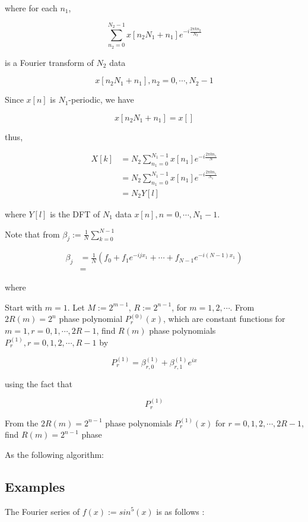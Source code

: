 \documentclass[12pt]{article}
\theoremstyle{nonumberbreak}
\begin{document}
where for each $n_1$,

$$
\sum_{n_2=0}^{N_2-1} x[n_2 N_1 + n_1] e^{-i \frac{2\pi kn_2}{N_2}}
$$

is a Fourier transform of $N_2$ data

$$
x[n_2 N_1 + n_1], n_2 = 0,\cdots, N_2 -1
$$

Since $x[n]$ is $N_1$-periodic, we have

$$
x[n_2 N_1 + n_1] = x[]
$$

thus,


$$
\begin{aligned}
X[k] &= N_2 \sum_{n_1=0}^{N_1 -1} x[n_1] e^{-i\frac{2\pi k n_1}{N}} \\[8pt]
&= N_2 \sum_{n_1=0}^{N_1-1} x[n_1] e^{-i \frac{2\pi k n_1}{N_1}} \\[8pt]
&= N_2 Y[l]
\end{aligned}
$$

where $Y[l]$ is the DFT of $N_1$ data $x[n], n=0,\cdots,N_1-1$. 



Note that from $\beta_j := \frac{1}{N} \sum_{k=0}^{N-1}$

$$
\begin{aligned}
\beta_j &= \frac{1}{N} \left( f_0 + f_1 e^{-ijx_1} + \cdots + f_{N-1} e^{-i(N-1)x_1} \right) \\[8pt]
&= 
\end{aligned}
$$

where


Start with $m=1$. Let $M:= 2^{m-1}$, $R:= 2^{n-1}$, for $m=1,2,\cdots$. From $2R(m) = 2^n$ phase polynomial $P_r^{(0)}(x)$, which are constant functions for $m=1, r=0,1,\cdots,2R-1$, find $R(m)$ phase polynomials $P_r^{(1)}, r=0,1,2,\cdots,R-1$ by

$$
P_r^{(1)} = \beta_{r,0}^{(1)} + \beta_{r,1}^{(1)} e^{ix}
$$

using the fact that 

$$
P_r^{(1)}
$$


From the $2R(m) = 2^{n-1}$ phase polynomials $P_r^{(1)} (x)$ for $r=0,1,2,\cdots,2R-1$, find $R(m) = 2^{n-1}$ phase 









As the following algorithm: 


\subsection*{Examples}


The Fourier series of $f(x):= sin^5(x)$ is as follows :
\end{document}
